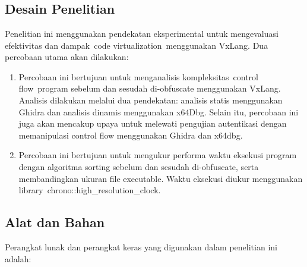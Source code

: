 \chapter{\babTiga}

\section{Desain Penelitian}
Penelitian ini menggunakan pendekatan eksperimental untuk mengevaluasi efektivitas dan dampak code virtualization menggunakan VxLang. Dua percobaan utama akan dilakukan:

\begin{enumerate}
	\item {} Percobaan ini bertujuan untuk menganalisis kompleksitas control flow program sebelum dan sesudah di-obfuscate menggunakan VxLang. Analisis dilakukan melalui dua pendekatan: analisis statis menggunakan Ghidra dan analisis dinamis menggunakan x64Dbg. Selain itu, percobaan ini juga akan mencakup upaya untuk melewati pengujian autentikasi dengan memanipulasi control flow menggunakan Ghidra dan x64dbg.
	\item {} Percobaan ini bertujuan untuk mengukur performa waktu eksekusi program dengan algoritma sorting sebelum dan sesudah di-obfuscate, serta membandingkan ukuran file executable. Waktu eksekusi diukur menggunakan library chrono::high\_resolution\_clock.
\end{enumerate}
\section{Alat dan Bahan}
Perangkat lunak dan perangkat keras yang digunakan dalam penelitian ini adalah:

